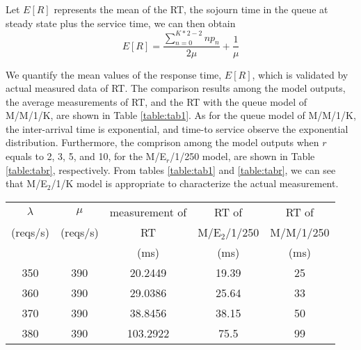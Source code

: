 \documentclass[10pt,journal,letterpaper,compsoc]{IEEEtran}
\begin{document}
Let $E[R]$ represents the mean of the RT,
the sojourn time in the queue at steady state plus the service time,
we can then obtain
\begin{equation}
\label{equ:eq16}
E[R]=\frac{\sum_{n=0}^{K*2-2}np_n}{2\mu}+\frac{1}{\mu}
\end{equation}

We quantify the mean values of the response time, $E[R]$,
which is validated by actual measured data of RT.
The comparison results among the model outputs, the average measurements of RT,
and the RT with the queue model of M/M/1/K,
are shown in Table \ref{table:tab1}.
As for the queue model of M/M/1/K, 
the inter-arrival time is exponential, and time-to service observe
the exponential distribution.
Furthermore, the comprison among the model outputs when $r$ equals to 2, 3, 5, and 10, 
for the M/E$_r$/1/250 model, are shown in Table \ref{table:tabr}, respectively.
From tables \ref{table:tab1} and \ref{table:tabr},
we can see that M/E$_2$/1/K model is appropriate to characterize
the actual measurement.

\begin{table*}[!t]
\renewcommand{\arraystretch}{1.3}
\caption{Comparison results of RT among measurements, M/E$_2$/1/K and M/M/1/K }
\label{table:tab1}
\centering
\begin{tabular}{ c c c c c }
\hline
$\lambda$    & $\mu$        & measurement of        & RT of         & RT of     \\
(reqs/s)     & (reqs/s)     & RT                & M/E$_2$/1/250 & M/M/1/250 \\
             &              & (ms)              & (ms)          & (ms)      \\
\hline
350          & 390          & 20.2449           & 19.39         & 25        \\
360          & 390          & 29.0386           & 25.64         & 33        \\
370          & 390          & 38.8456           & 38.15         & 50        \\
380          & 390          & 103.2922          & 75.5          & 99        \\
\hline
\end{tabular}
\end{table*}
\end{document}
